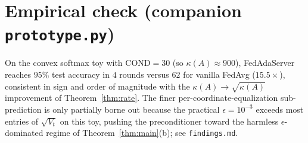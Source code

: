 \documentclass[11pt]{article}
\theoremstyle{definition}
\begin{document}
\section{Empirical check (companion \texttt{prototype.py})}
On the convex softmax toy with $\mathrm{COND}=30$ (so $\kappa(A)\approx900$),
FedAdaServer reaches $95\%$ test accuracy in $4$ rounds versus $62$ for vanilla
FedAvg ($15.5\times$), consistent in sign and order of magnitude with the
$\kappa(A)\!\to\!\sqrt{\kappa(A)}$ improvement of Theorem~\ref{thm:rate}. The
finer per-coordinate-equalization sub-prediction is only partially borne out
because the practical $\epsilon=10^{-3}$ exceeds most entries of $\sqrt{V_t}$ on
this toy, pushing the preconditioner toward the harmless $\epsilon$-dominated
regime of Theorem~\ref{thm:main}(b); see \texttt{findings.md}.
\end{document}
